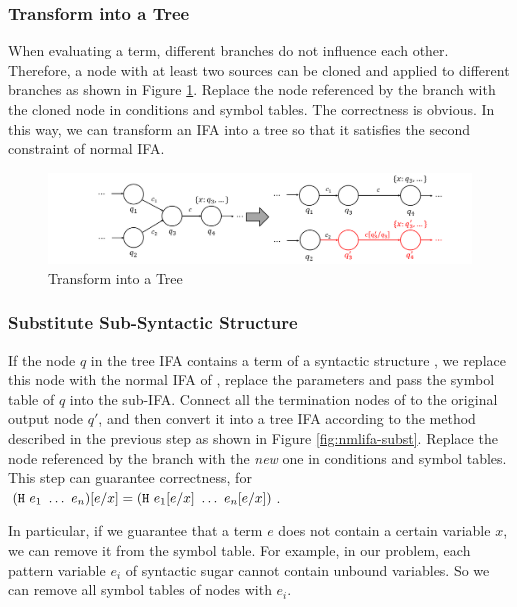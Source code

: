 \subsubsection{Transform into a Tree}

When evaluating a term, different branches do not influence each other. Therefore, a node with at least two sources can be cloned and applied to different branches as shown in Figure \ref{fig:nmlifa-tree}. Replace the node referenced by the branch with the cloned node in conditions and symbol tables. The correctness is obvious. In this way, we can transform an IFA into a tree so that it satisfies the second constraint of normal IFA.

\begin{figure}[t]
	\centering
    \includegraphics[scale=0.25]{images/nmlifa/nmlifa-tree.png}
	\caption{Transform into a Tree}
	\label{fig:nmlifa-tree}
\end{figure}

\subsubsection{Substitute Sub-Syntactic Structure}
\label{mark:hygieneinderive}

If the node $q$ in the tree IFA contains a term of a syntactic structure , we replace this node with the normal IFA of , replace the parameters and pass the symbol table of $q$ into the sub-IFA. Connect all the termination nodes of  to the original output node $q'$, and then convert it into a tree IFA according to the method described in the previous step as shown in Figure \ref{fig:nmlifa-subst}. Replace the node referenced by the branch with the \textit{new} one in conditions and symbol tables. This step can guarantee correctness, for $(\mbox{\tt H}~e_1~\ldots~e_n)[e/x] = (\mbox{\tt H}~e_1[e/x]~\ldots~e_n[e/x])$.

In particular, if we guarantee that a term $e$ does not contain a certain variable $x$, we can remove it from the symbol table. For example, in our problem, each pattern variable $e_i$ of syntactic sugar cannot contain unbound variables. So we can remove all symbol tables of nodes with $e_i$.

